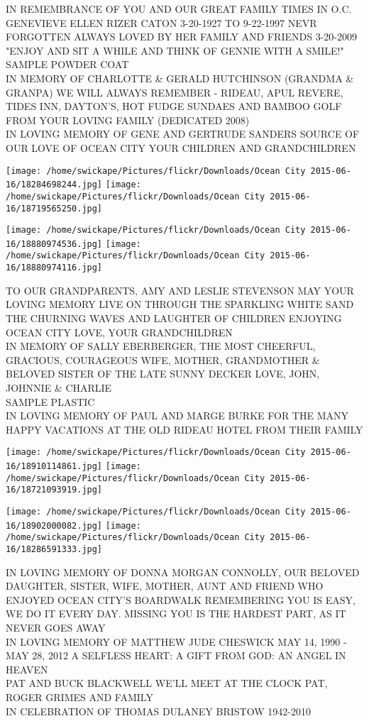 \documentclass[10pt,letterpaper]{article}
\begin{document}
IN REMEMBRANCE OF YOU AND OUR GREAT FAMILY TIMES IN O.C. GENEVIEVE ELLEN RIZER CATON 3{-}20{-}1927 TO 9{-}22{-}1997 NEVR FORGOTTEN ALWAYS LOVED BY HER FAMILY AND FRIENDS 3{-}20{-}2009 "ENJOY AND SIT A WHILE AND THINK OF GENNIE WITH A SMILE!"\\
SAMPLE POWDER COAT\\
IN MEMORY OF CHARLOTTE \& GERALD HUTCHINSON (GRANDMA \& GRANPA) WE WILL ALWAYS REMEMBER {-} RIDEAU, APUL REVERE, TIDES INN, DAYTON'S, HOT FUDGE SUNDAES AND BAMBOO GOLF FROM YOUR LOVING FAMILY (DEDICATED 2008)\\
IN LOVING MEMORY OF GENE AND GERTRUDE SANDERS SOURCE OF OUR LOVE OF OCEAN CITY YOUR CHILDREN AND GRANDCHILDREN\\
\pagebreak

\texttt{[image: /home/swickape/Pictures/flickr/Downloads/Ocean City 2015-06-16/18284698244.jpg]}
\texttt{[image: /home/swickape/Pictures/flickr/Downloads/Ocean City 2015-06-16/18719565250.jpg]}

\texttt{[image: /home/swickape/Pictures/flickr/Downloads/Ocean City 2015-06-16/18880974536.jpg]}
\texttt{[image: /home/swickape/Pictures/flickr/Downloads/Ocean City 2015-06-16/18880974116.jpg]}

TO OUR GRANDPARENTS, AMY AND LESLIE STEVENSON MAY YOUR LOVING MEMORY LIVE ON THROUGH THE SPARKLING WHITE SAND THE CHURNING WAVES AND LAUGHTER OF CHILDREN ENJOYING OCEAN CITY LOVE, YOUR GRANDCHILDREN\\
IN MEMORY OF SALLY EBERBERGER, THE MOST CHEERFUL, GRACIOUS, COURAGEOUS WIFE, MOTHER, GRANDMOTHER \& BELOVED SISTER OF THE LATE SUNNY DECKER LOVE, JOHN, JOHNNIE \& CHARLIE\\
SAMPLE PLASTIC\\
IN LOVING MEMORY OF PAUL AND MARGE BURKE FOR THE MANY HAPPY VACATIONS AT THE OLD RIDEAU HOTEL FROM THEIR FAMILY\\
\pagebreak

\texttt{[image: /home/swickape/Pictures/flickr/Downloads/Ocean City 2015-06-16/18910114861.jpg]}
\texttt{[image: /home/swickape/Pictures/flickr/Downloads/Ocean City 2015-06-16/18721093919.jpg]}

\texttt{[image: /home/swickape/Pictures/flickr/Downloads/Ocean City 2015-06-16/18902000082.jpg]}
\texttt{[image: /home/swickape/Pictures/flickr/Downloads/Ocean City 2015-06-16/18286591333.jpg]}

IN LOVING MEMORY OF DONNA MORGAN CONNOLLY, OUR BELOVED DAUGHTER, SISTER, WIFE, MOTHER, AUNT AND FRIEND WHO ENJOYED OCEAN CITY'S BOARDWALK REMEMBERING YOU IS EASY, WE DO IT EVERY DAY.  MISSING YOU IS THE HARDEST PART, AS IT NEVER GOES AWAY\\
IN LOVING MEMORY OF MATTHEW JUDE CHESWICK MAY 14, 1990 {-} MAY 28, 2012 A SELFLESS HEART: A GIFT FROM GOD: AN ANGEL IN HEAVEN\\
PAT AND BUCK BLACKWELL WE'LL MEET AT THE CLOCK PAT, ROGER GRIMES AND FAMILY\\
IN CELEBRATION OF THOMAS DULANEY BRISTOW 1942{-}2010\\
\pagebreak
\end{document}
